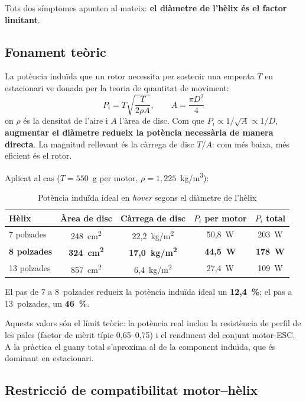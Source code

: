Tots dos símptomes apunten al mateix: \textbf{el diàmetre de l'hèlix és el factor limitant}.

\subsection{Fonament teòric}
\label{subsec:propulsor-teoria}

La potència induïda que un rotor necessita per sostenir una empenta $T$ en estacionari ve donada per la teoria de quantitat de moviment:
\[
P_i = T \sqrt{\frac{T}{2\rho A}}, \qquad A = \frac{\pi D^2}{4}
\]
on $\rho$ és la densitat de l'aire i $A$ l'àrea de disc. Com que $P_i \propto 1/\sqrt{A} \propto 1/D$, \textbf{augmentar el diàmetre redueix la potència necessària de manera directa}. La magnitud rellevant és la càrrega de disc $T/A$: com més baixa, més eficient és el rotor.

Aplicat al cas ($T = 550$~g per motor, $\rho = 1{,}225$~kg/m\textsuperscript{3}):

\begin{table}[H]
    \centering
    \caption{Potència induïda ideal en \emph{hover} segons el diàmetre de l'hèlix}
    \label{tab:potencia-induida}
    \small
    \begin{tabular}{lcccc}
        \toprule
        Hèlix & Àrea de disc & Càrrega de disc & $P_i$ per motor & $P_i$ total \\
        \midrule
        7 polzades & 248~cm\textsuperscript{2} & 22,2~kg/m\textsuperscript{2} & 50,8~W & 203~W \\
        \textbf{8 polzades} & \textbf{324~cm\textsuperscript{2}} & \textbf{17,0~kg/m\textsuperscript{2}} & \textbf{44,5~W} & \textbf{178~W} \\
        13 polzades & 857~cm\textsuperscript{2} & 6,4~kg/m\textsuperscript{2} & 27,4~W & 109~W \\
        \bottomrule
    \end{tabular}
\end{table}

El pas de 7 a 8~polzades redueix la potència induïda ideal un \textbf{12,4~\%}; el pas a 13~polzades, un \textbf{46~\%}.

Aquests valors són el límit teòric: la potència real inclou la resistència de perfil de les pales (factor de mèrit típic 0,65--0,75) i el rendiment del conjunt motor-ESC. A la pràctica el guany total s'aproxima al de la component induïda, que és dominant en estacionari.

\subsection{Restricció de compatibilitat motor--hèlix}
\label{subsec:propulsor-kv}

